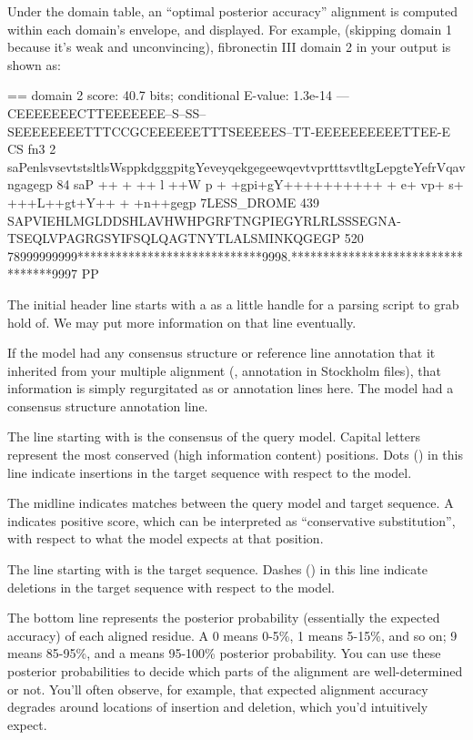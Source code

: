 Under the domain table, an ``optimal posterior accuracy'' alignment
\citep{Holmes98} is computed within each domain's envelope, and
displayed. For example, (skipping domain 1 because it's weak and
unconvincing), fibronectin III domain 2 in your 
output is shown as:

\begin{samepage}
\begin{sreoutput}
  == domain 2  score: 40.7 bits;  conditional E-value: 1.3e-14
                  ---CEEEEEEECTTEEEEEEE--S--SS--SEEEEEEEETTTCCGCEEEEEETTTSEEEEES--TT-EEEEEEEEEETTEE-E CS
          fn3   2 saPenlsvsevtstsltlsWsppkdgggpitgYeveyqekgegeewqevtvprtttsvtltgLepgteYefrVqavngagegp 84 
                  saP   ++ +  ++ l ++W p +  +gpi+gY++++++++++  + e+ vp+   s+ +++L++gt+Y++ +  +n++gegp
  7LESS_DROME 439 SAPVIEHLMGLDDSHLAVHWHPGRFTNGPIEGYRLRLSSSEGNA-TSEQLVPAGRGSYIFSQLQAGTNYTLALSMINKQGEGP 520
                  78999999999*****************************9998.**********************************9997 PP
\end{sreoutput}
\end{samepage}

The initial header line starts with a \prog{==} as a little handle for
a parsing script to grab hold of. We may put more information on that line
eventually.

If the model had any consensus structure or reference line annotation
that it inherited from your multiple alignment (,
 annotation in Stockholm files), that information is
simply regurgitated as  or  annotation lines
here. The  model had a consensus structure annotation line.

The line starting with  is the consensus of the query
model. Capital letters represent the most conserved (high information
content) positions. Dots () in this line indicate insertions
in the target sequence with respect to the model.

The midline indicates matches between the query model and target
sequence. A \prog{+} indicates positive score, which can be
interpreted as ``conservative substitution'', with respect to what the
model expects at that position.

The line starting with  is the target sequence.
Dashes (\prog{-}) in this line indicate deletions in the target
sequence with respect to the model.

The bottom line represents the posterior
probability (essentially the expected accuracy) of each aligned
residue. A 0 means 0-5\%, 1 means 5-15\%, and so on; 9 means 85-95\%,
and a \prog{*} means 95-100\% posterior probability. You can use these
posterior probabilities to decide which parts of the alignment are
well-determined or not. You'll often observe, for example, that
expected alignment accuracy degrades around locations of insertion and
deletion, which you'd intuitively expect. 

